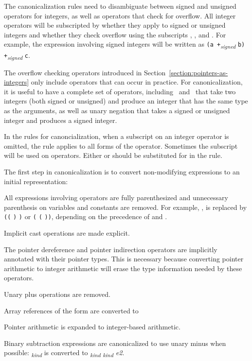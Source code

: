 The canonicalization rules need to disambiguate between signed and
unsigned operators for integers, as well as operators that check for
overflow. All integer operators will be subscripted by whether they
apply to signed or unsigned integers and whether they check overflow 
using the subscripts , , and
. For example, the expression  involving
signed integers will be written as \texttt{(a
+}\emph{\textsubscript{signed}} \texttt{b)
+}\emph{\textsubscript{signed}} \texttt{c}.

The overflow checking operators introduced in
Section~\ref{section:pointers-as-integers} only include
operators that can occur in practice. For canonicalization, it is useful
to have a complete set of operators, including
\plusovf\ and \minusovf\ that
take two integers (both signed or unsigned) and produce an integer that
has the same type as the arguments, as well as unary negation that takes
a signed or unsigned integer and produces a signed integer.

In the rules for canoncialization, when a subscript on an integer
operator is omitted, the rule applies to all forms of the operator.
Sometimes the subscript  will be used on operators. Either
 or  should be substituted for 
in the rule.

The first step in canonicalization is to convert non-modifying
expressions to an initial representation:

\begin{compactenum}
\item
  All expressions involving operators are fully parenthesized and
  unnecessary parenthesis on variables and constants are removed. For
  example,     , is
  replaced by \texttt{((}  \texttt{)}
   \texttt{)} or \texttt{(} 
  \texttt{(}  \texttt{))}, depending on the
  precedence of  and .
\item
  Implicit cast operations are made explicit.
\item
  The pointer dereference \code{*} and pointer indirection operators
  \code{(->)} are implicitly annotated with their pointer types.
  This is necessary because converting pointer arithmetic to integer
  arithmetic will erase the type information needed by these operators.
\item
  Unary plus operations are removed.
\item
  Array references of the form
  \code{[}\code{]} are converted to
  \code{*((}\code{)} \code{+}
  \code{(}\code{))}
\item
  Pointer arithmetic is expanded to integer-based arithmetic.
\item
  Binary subtraction expressions are canonicalized to use unary minus
  when possible:  \code{-}\emph{\textsubscript{kind}}
   is converted to 
  \code{+}\emph{\textsubscript{kind}}
  \code{-}\emph{\textsubscript{kind} e2}.
\end{compactenum}

